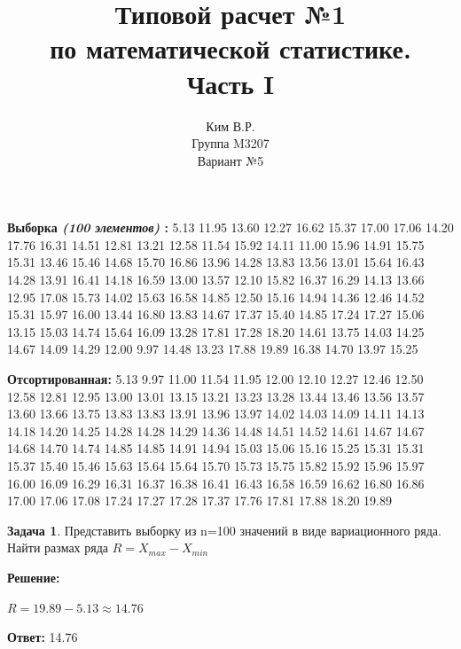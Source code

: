 \documentclass[a4paper,11pt]{article}
\title{Типовой расчет №1 \\ по математической статистике. \\ Часть I}
\author{Ким В.Р. \\ Группа M3207 \\ Вариант №5}
\date{}
\theoremstyle{definition}
\newtheorem{problem}{Задача}\setlength{\parindent}{0pt}
\newenvironment{solution}
{\begin{shaded}\textbf{Решение:}\par\setlength{\parindent}{0pt}}
{\end{shaded}}
\newenvironment{answer}
{\par\noindent\textbf{Ответ:} }
{\par}
\begin{document}
\maketitle

\par\noindent\textbf{Выборка \textit{(100 элементов)} :}
5.13 11.95 13.60 12.27 16.62 15.37 17.00 17.06 14.20 17.76 16.31 14.51 12.81 13.21 12.58
11.54 15.92 14.11 11.00 15.96 14.91 15.75 15.31 13.46 15.46 14.68 15.70 16.86 13.96 14.28
13.83 13.56 13.01 15.64 16.43 14.28 13.91 16.41 14.18 16.59 13.00 13.57 12.10 15.82 16.37
16.29 14.13 13.66 12.95 17.08 15.73 14.02 15.63 16.58 14.85 12.50 15.16 14.94 14.36 12.46
14.52 15.31 15.97 16.00 13.44 16.80 13.83 14.67 17.37 15.40 14.85 17.24 17.27 15.06 13.15
15.03 14.74 15.64 16.09 13.28 17.81 17.28 18.20 14.61 13.75 14.03 14.25 14.67 14.09 14.29
12.00 9.97 14.48 13.23 17.88 19.89 16.38 14.70 13.97 15.25
\\
\par\noindent\textbf{Отсортированная:}
5.13 9.97 11.00 11.54 11.95 12.00 12.10 12.27 12.46 12.50 12.58 12.81 12.95 13.00 13.01
13.15 13.21 13.23 13.28 13.44 13.46 13.56 13.57 13.60 13.66 13.75 13.83 13.83 13.91 13.96
13.97 14.02 14.03 14.09 14.11 14.13 14.18 14.20 14.25 14.28 14.28 14.29 14.36 14.48 14.51
14.52 14.61 14.67 14.67 14.68 14.70 14.74 14.85 14.85 14.91 14.94 15.03 15.06 15.16 15.25
15.31 15.31 15.37 15.40 15.46 15.63 15.64 15.64 15.70 15.73 15.75 15.82 15.92 15.96 15.97
16.00 16.09 16.29 16.31 16.37 16.38 16.41 16.43 16.58 16.59 16.62 16.80 16.86 17.00 17.06
17.08 17.24 17.27 17.28 17.37 17.76 17.81 17.88 18.20 19.89



\vspace{8pt}
\begin{problem}
    Представить выборку из n=100 значений в виде вариационного ряда. Найти
    размах ряда $R = X_{max} - X_{min}$
        \begin{solution}
            \( R = 19.89 - 5.13 \approx 14.76\)
        \end{solution}

        \begin{answer}
            14.76
        \end{answer}

    \end{problem}
\end{document}
